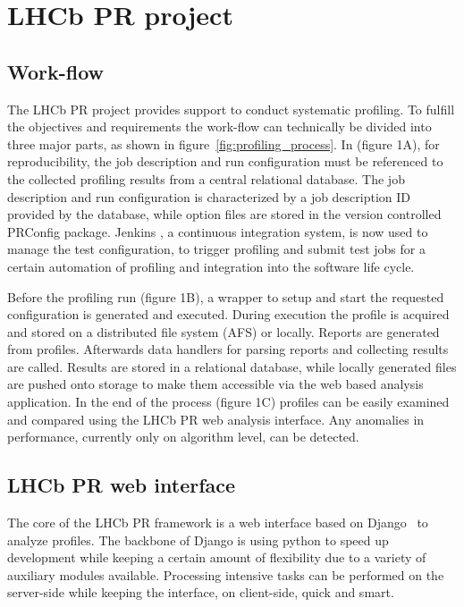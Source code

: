 \documentclass[a4paper]{jpconf}
\begin{document}
\section{LHCb PR project}
\label{sec:lhcbpr}

\subsection{Work-flow}
\label{sec:workflow}

The LHCb PR project provides support to conduct systematic profiling. To fulfill the objectives and requirements the work-flow can technically be divided into three major parts, as shown in \mbox{figure \ref{fig:profiling_process}}. In (figure 1A), for reproducibility, the job description and run configuration must be referenced to the collected profiling results from a central relational database. The job description and run configuration is characterized by a job description ID provided by the database, while option files are stored in the version controlled PRConfig package. Jenkins \cite{jenkins}, a continuous integration system, is now used to manage the test configuration, to trigger profiling and submit test jobs for a certain automation of profiling and integration into the software life cycle.

Before the profiling run (figure 1B), a wrapper to setup and start the requested configuration is generated and executed. During execution the profile is acquired and stored on a distributed file system (AFS) or locally. Reports are generated from profiles. Afterwards data handlers for parsing reports and collecting results are called. Results are stored in a relational database, while locally generated files are pushed onto storage to make them accessible via the web based analysis application. In the end of the process (figure 1C) profiles can be easily examined and compared using the LHCb PR web analysis interface. Any anomalies in performance, currently only on algorithm level, can be detected. 

\subsection{LHCb PR web interface}
\label{sec:lhcbpr_web_interface}

The core of the LHCb PR framework is a web interface based on \mbox{Django \cite{django}} to analyze profiles. The backbone of Django is using python to speed up development while keeping a certain amount of flexibility due to a variety of auxiliary modules available. Processing intensive tasks can be performed on the server-side while keeping the interface, on client-side, quick and smart.
\end{document}
